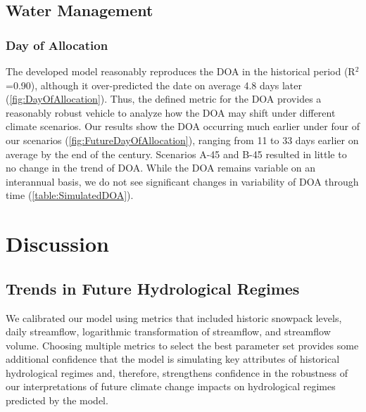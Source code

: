 \documentclass[11pt,letterpaper]{article}
\begin{document}
\subsection{Water Management}

\subsubsection{Day of Allocation}

The developed model reasonably reproduces the DOA in the historical period (R${}^2$=0.90), although it over-predicted the date on average 4.8 days later (\cref{fig:DayOfAllocation}). Thus, the defined metric for the DOA provides a reasonably robust vehicle to analyze how the DOA may shift under different climate scenarios.
Our results show the DOA occurring much earlier under four of our scenarios (\cref{fig:FutureDayOfAllocation}), ranging from 11 to 33 days earlier on average by the end of the century. Scenarios A-45 and B-45 resulted in little to no change in the trend of DOA. While the DOA remains variable on an interannual basis, we do not see significant changes in variability of DOA through time (\cref{table:SimulatedDOA}).

\section{Discussion}

\subsection{Trends in Future Hydrological Regimes}

We calibrated our model using metrics that included historic snowpack levels, daily streamflow, logarithmic transformation of streamflow, and streamflow volume. Choosing multiple metrics to select the best parameter set provides some additional confidence that the model is simulating key attributes of historical hydrological regimes and, therefore, strengthens confidence in the robustness of our interpretations of future climate change impacts on hydrological regimes predicted by the model. 
\end{document}
